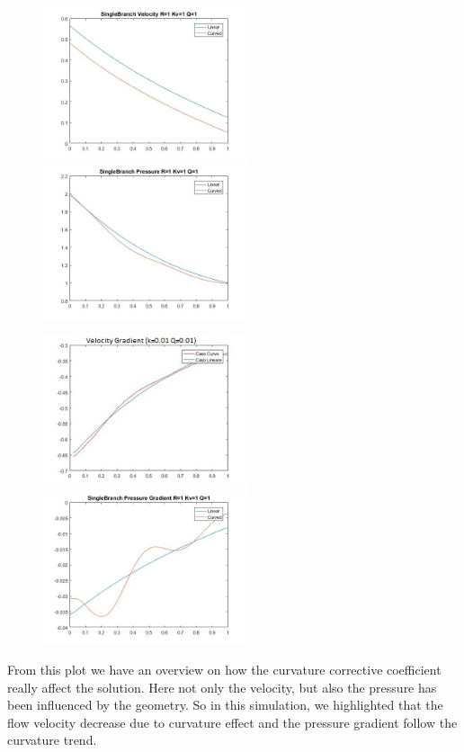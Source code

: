 \documentclass[a4paper]{report}
\begin{document}
\begin{figure}[ht]
\centering
\includegraphics[width= 60mm]{SingleBranch_velocity_3}%
\qquad \qquad
\includegraphics[width= 60mm]{SingleBranch_Pressure_3}
\end{figure}
\newpage
\begin{figure}[htbp]
\centering
\includegraphics[width= 60mm]{SingleBranch_velocity_3_gradient}%
\qquad \qquad
\includegraphics[width= 60mm]{SingleBranch_Pressure_3_gradient}
\end{figure}
From this plot we have an overview on how the curvature corrective coefficient really affect the solution. Here not only the velocity, but also the pressure has been influenced by the geometry. So in this simulation, we highlighted that the flow velocity decrease due to curvature effect and the pressure gradient follow the curvature trend.
\end{document}
